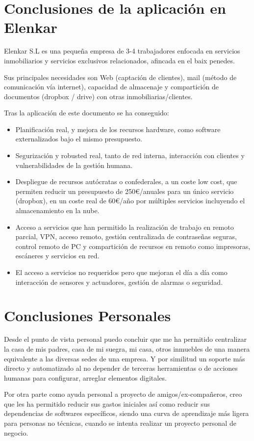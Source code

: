 \section{Conclusiones de la aplicación en Elenkar}
Elenkar S.L es una pequeña empresa de 3-4 trabajadores enfocada en servicios inmobiliarios y servicios exclusivos relacionados, afincada en el baix penedes.

Sus principales necesidades son Web (captación de clientes), mail (método de comunicación vía internet), capacidad de almacenaje y compartición de documentos (dropbox / drive) con otras inmobiliarias/clientes.

Tras la aplicación de este documento se ha conseguido:
\begin{itemize}
    \item Planificación real, y mejora de los recursos hardware, como software externalizados bajo el mismo presupuesto.
    \item Segurización y robusted real, tanto de red interna, interacción con clientes y vulnerabilidades de la gestión humana.
    \item Despliegue de recursos autócratas o confederales, a un coste low cost, que permiten reducir un presupuesto de 250€/anuales para un único servicio (dropbox), en un coste real de 60€/año por múltiples servicios incluyendo el almacenamiento en la nube.
    \item Acceso a servicios que han permitido la realización de trabajo en remoto parcial, VPN, acceso remoto, gestión centralizada de contraseñas seguras, control remoto de PC y compartición de recursos en remoto como impresoras, escáneres y servicios en red.
    \item El acceso a servicios no requeridos pero que mejoran el día a día como interacción de sensores y actuadores, gestión de alarmas o seguridad.
\end{itemize}

\section{Conclusiones Personales}
Desde el punto de vista personal puedo concluir que me ha permitido centralizar la casa de mis padres, casa de mi suegra, mi casa, otros inmuebles de una manera equivalente a las diversas sedes de una empresa. Y por similitud un soporte más directo y automatizado al no depender de terceras herramientas o de acciones humanas para configurar, arreglar elementos digitales.

Por otra parte como ayuda personal a proyecto de amigos/ex-compañeros, creo que les ha permitido reducir sus gastos iniciales así como reducir sus dependencias de softwares específicos, siendo una curva de aprendizaje más ligera para personas no técnicas, cuando se intenta realizar un proyecto personal de negocio.

